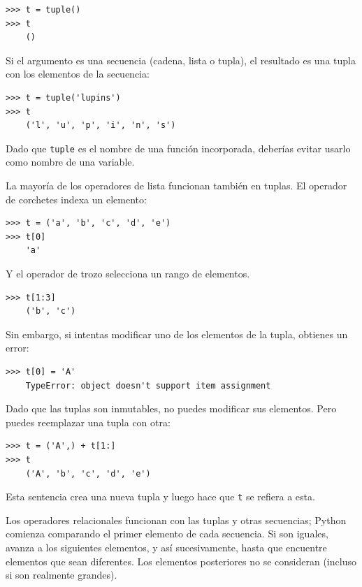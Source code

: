 \documentclass[10pt]{book}
\begin{document}
\begin{verbatim}
>>> t = tuple()
>>> t
    ()
\end{verbatim}
%
Si el argumento es una secuencia (cadena, lista o tupla), el resultado
es una tupla con los elementos de la secuencia:

\begin{verbatim}
>>> t = tuple('lupins')
>>> t
    ('l', 'u', 'p', 'i', 'n', 's')
\end{verbatim}
%
Dado que {\tt tuple} es el nombre de una función incorporada, deberías
evitar usarlo como nombre de una variable.

La mayoría de los operadores de lista funcionan también en tuplas.  El operador de corchetes
indexa un elemento:

\begin{verbatim}
>>> t = ('a', 'b', 'c', 'd', 'e')
>>> t[0]
    'a'
\end{verbatim}
%
Y el operador de trozo selecciona un rango de elementos.

\begin{verbatim}
>>> t[1:3]
    ('b', 'c')
\end{verbatim}
%
Sin embargo, si intentas modificar uno de los elementos de la tupla, obtienes
un error:

\begin{verbatim}
>>> t[0] = 'A'
    TypeError: object doesn't support item assignment
\end{verbatim}
%
Dado que las tuplas son inmutables, no puedes modificar sus elementos.  Pero
puedes reemplazar una tupla con otra:

\begin{verbatim}
>>> t = ('A',) + t[1:]
>>> t
    ('A', 'b', 'c', 'd', 'e')
\end{verbatim}
%
Esta sentencia crea una nueva tupla y luego hace que {\tt t} se refiera a esta.

Los operadores relacionales funcionan con las tuplas y otras secuencias;
Python comienza comparando el primer elemento de cada
secuencia.  Si son iguales, avanza a los siguientes elementos,
y así sucesivamente, hasta que encuentre elementos que sean diferentes.  Los elementos
posteriores no se consideran (incluso si son realmente grandes).
\end{document}
